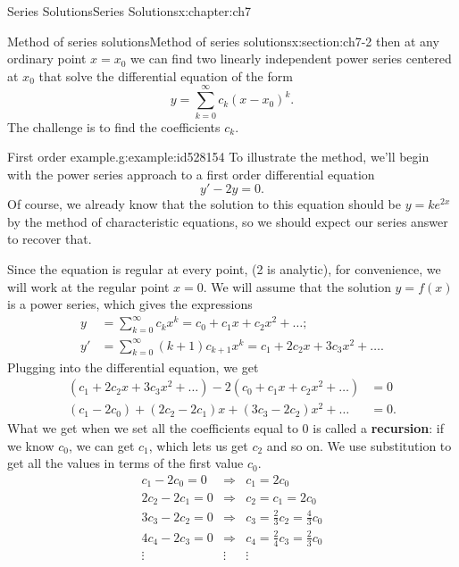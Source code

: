 \documentclass[oneside,10pt,]{book}
\newcommand{\terminology}[1]{\textbf{#1}}
\numberwithin{equation}{section}
\numberwithin{equation}{section}
\newcommand{\amp}{&}
\begin{document}
\begin{chapterptx}{Series Solutions}{}{Series Solutions}{}{}{x:chapter:ch7}
\begin{sectionptx}{Method of series solutions}{}{Method of series solutions}{}{}{x:section:ch7-2}
then at any ordinary point \(x = x_0\) we can find two linearly independent power series centered at \(x_0\) that solve the differential equation of the form%
\begin{equation*}
y = \sum_{k=0}^\infty c_k (x-x_0)^k.
\end{equation*}
The challenge is to find the coefficients \(c_k\).%
\begin{example}{First order example.}{g:example:id528154}%
To illustrate the method, we'll begin with the power series approach to a first order differential equation%
\begin{equation*}
y' - 2y = 0.
\end{equation*}
Of course, we already know that the solution to this equation should be \(y = k e^{2x}\) by the method of characteristic equations, so we should expect our series answer to recover that.%
\par
Since the equation is regular at every point, (2 is analytic), for convenience, we will work at the regular point \(x = 0\). We will assume that the solution \(y = f(x)\) is a power series, which gives the expressions%
\begin{align*}
y \amp = \sum_{k=0}^\infty c_k x^k  = c_0 + c_1 x + c_2 x^2 + \ldots;\\
y' \amp = \sum_{k=0}^\infty (k+1) c_{k+1} x^k  = c_1 + 2c_2 x + 3c_3 x^2 + \ldots.
\end{align*}
Plugging into the differential equation, we get%
\begin{align*}
(c_1 + 2c_2 x + 3c_3 x^2 + \ldots) - 2(c_0 + c_1 x + c_2 x^2 + \ldots) \amp = 0\\
(c_1 - 2c_0) + (2c_2 - 2c_1)x + (3c_3 - 2c_2)x^2 + \ldots\amp = 0.
\end{align*}
What we get when we set all the coefficients equal to 0 is called a \terminology{recursion}: if we know \(c_0\), we can get \(c_1\), which lets us get \(c_2\) and so on. We use substitution to get all the values in terms of the first value \(c_0\).%
\begin{equation*}
\begin{array}{ccc}
c_1 - 2c_0 = 0 \amp \Rightarrow \amp c_1 = 2c_0 \\
2c_2 - 2c_1 = 0 \amp \Rightarrow \amp c_2 = c_1 = 2c_0 \\
3c_3 - 2c_2 = 0 \amp \Rightarrow \amp c_3 = \frac{2}{3}c_2 = \frac{4}{3}c_0 \\
4c_4 - 2c_3 = 0 \amp \Rightarrow \amp c_4 = \frac{2}{4}c_3 = \frac{2}{3} c_0 \\
\vdots \amp \vdots \amp \vdots

\end{array}
\end{equation*}
\end{example}
\end{sectionptx}
\end{chapterptx}
\end{document}
